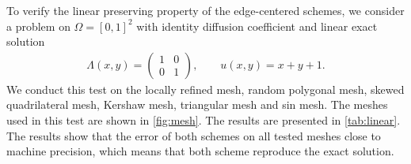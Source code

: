 \documentclass[times,review,preprint]{elsarticle}
\begin{document}
To verify the linear preserving property of the edge-centered schemes, we consider a problem on $\Omega = [0,1]^2$ with identity diffusion coefficient and linear exact solution
\begin{align*}
\Lambda(x,y) =
\left(
\begin{matrix}
1 & 0 \\
0 & 1
\end{matrix}
\right),
\qquad
u(x,y) = x + y + 1.
\end{align*}
We conduct this test on the locally refined mesh, random polygonal mesh, skewed quadrilateral mesh, Kershaw mesh, triangular mesh and sin mesh. The meshes used in this test are shown in \cref{fig:mesh}. The results are presented in \cref{tab:linear}. The results show that the error of both schemes on all tested meshes close to machine precision, which means that both scheme reproduce the exact solution.
\end{document}
